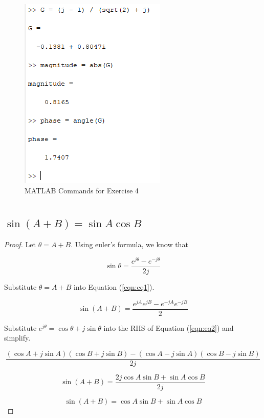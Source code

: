 \documentclass[12pt]{article}
\numberwithin{equation}{section}
\newcommand\ddfrac[2]{\frac{\displaystyle #1}{\displaystyle #2}}
\begin{document}
  \begin{figure}
    \centering
    \normalsize
    \includegraphics{./figures/fig1}
    \caption{MATLAB Commands for Exercise 4}
    \label{fig:fig1}
  \end{figure}

  \newpage

  \section{}

  \subsection{$\sin(A+B) = \sin A \cos B$}

  \begin{proof}
    Let $ \theta = A + B. $ Using euler's formula, we know that

    \begin{equation} \label{eqn:eq1}
      \sin \theta = \ddfrac{e^{j \theta} - e^{-j \theta}}{2j}
    \end{equation}

    Substitute $ \theta = A + B$ into Equation (\ref{eqn:eq1}).

    \begin{equation} \label{eqn:eq2}
      \sin(A+B) = \ddfrac{e^{jA}e^{jB} - e^{-jA}e^{-jB}}{2}
    \end{equation}

    Substitute $ e^{j \theta} = \cos \theta + j\sin \theta $ into the RHS  of Equation (\ref{eqn:eq2}) and simplify.

    \begin{equation}
      \frac{(\cos A + j\sin A)(\cos B + j\sin B) - (\cos A - j\sin A)(\cos B - j\sin B)}{2j}
    \end{equation}

    \begin{equation}
      \sin(A+B) = \frac{2j \cos A \sin B + \sin A \cos B}{2j}
    \end{equation}

    \begin{equation}
      \sin(A+B) = \cos A \sin B + \sin A \cos B \tag*{\qedhere}
    \end{equation}
  \end{proof}
\end{document}
